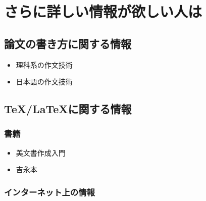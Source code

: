 \chapter{さらに詳しい情報が欲しい人は}
\label{ch:information}



\section{論文の書き方に関する情報}
\label{sec:thesisinfo}

\begin{itemize}
    \item 理科系の作文技術
    \item 日本語の作文技術
\end{itemize}



\section{\TeX/\LaTeX に関する情報}
\label{sec:latexinfo}


\subsection{書籍}
\label{ssec:book}

\begin{itemize}
    \item 美文書作成入門
    \item 吉永本
\end{itemize}




\subsection{インターネット上の情報}
\label{sec:internet}



